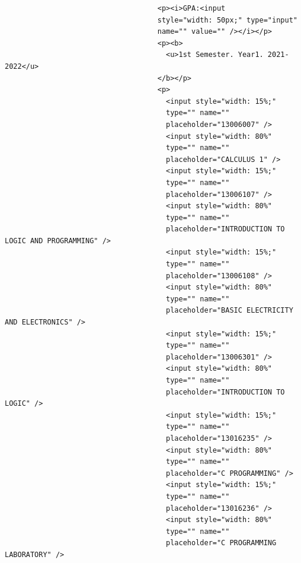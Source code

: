 \documentclass[12pt]{report} %
\begin{document}
\begin{verbatim}
                                    <p><i>GPA:<input 
                                    style="width: 50px;" type="input"
                                    name="" value="" /></i></p>
                                    <p><b>
                                      <u>1st Semester. Year1. 2021-2022</u>
                                    </b></p>
                                    <p>
                                      <input style="width: 15%;"
                                      type="" name=""
                                      placeholder="13006007" />
                                      <input style="width: 80%"
                                      type="" name=""
                                      placeholder="CALCULUS 1" />
                                      <input style="width: 15%;"
                                      type="" name=""
                                      placeholder="13006107" />
                                      <input style="width: 80%"
                                      type="" name=""
                                      placeholder="INTRODUCTION TO LOGIC AND PROGRAMMING" />
                                      <input style="width: 15%;"
                                      type="" name=""
                                      placeholder="13006108" />
                                      <input style="width: 80%"
                                      type="" name=""
                                      placeholder="BASIC ELECTRICITY AND ELECTRONICS" />
                                      <input style="width: 15%;"
                                      type="" name=""
                                      placeholder="13006301" />
                                      <input style="width: 80%"
                                      type="" name=""
                                      placeholder="INTRODUCTION TO LOGIC" />
                                      <input style="width: 15%;"
                                      type="" name=""
                                      placeholder="13016235" />
                                      <input style="width: 80%"
                                      type="" name=""
                                      placeholder="C PROGRAMMING" />
                                      <input style="width: 15%;"
                                      type="" name=""
                                      placeholder="13016236" />
                                      <input style="width: 80%"
                                      type="" name=""
                                      placeholder="C PROGRAMMING LABORATORY" />

\end{verbatim}
\end{document}
